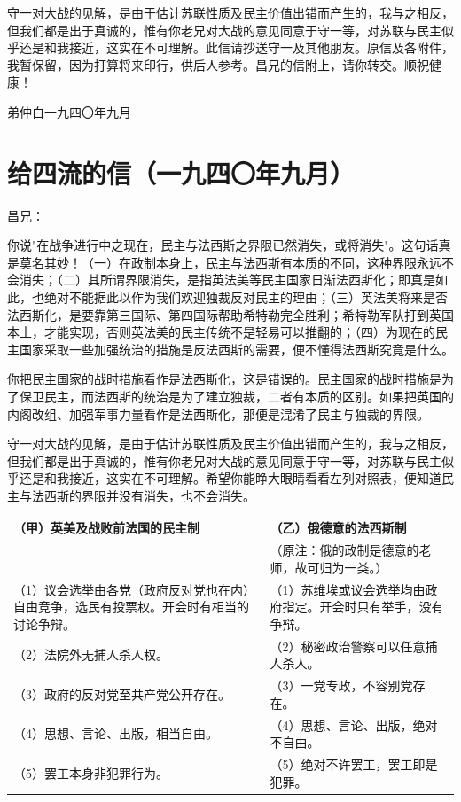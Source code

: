 \documentclass[
  openany,           %
  12pt,              %
  a4paper            %
]{ctexbook}
\begin{document}
守一对大战的见解，是由于估计苏联性质及民主价值出错而产生的，我与之相反，但我们都是出于真诚的，惟有你老兄对大战的意见同意于守一等，对苏联与民主似乎还是和我接近，这实在不可理解。此信请抄送守一及其他朋友。原信及各附件，我暂保留，因为打算将来印行，供后人参考。昌兄的信附上，请你转交。顺祝健康！

\hfill 弟仲白\quad 一九四〇年九月

\chapter{给四流的信（一九四〇年九月）}

\quad\quad 昌兄：

你说"在战争进行中之现在，民主与法西斯之界限已然消失，或将消失"。这句话真是莫名其妙！（一）在政制本身上，民主与法西斯有本质的不同，这种界限永远不会消失；（二）其所谓界限消失，是指英法美等民主国家日渐法西斯化；即真是如此，也绝对不能据此以作为我们欢迎独裁反对民主的理由；（三）英法美将来是否法西斯化，是要靠第三国际、第四国际帮助希特勒完全胜利；希特勒军队打到英国本土，才能实现，否则英法美的民主传统不是轻易可以推翻的；（四）为现在的民主国家采取一些加强统治的措施是反法西斯的需要，便不懂得法西斯究竟是什么。

你把民主国家的战时措施看作是法西斯化，这是错误的。民主国家的战时措施是为了保卫民主，而法西斯的统治是为了建立独裁，二者有本质的区别。如果把英国的内阁改组、加强军事力量看作是法西斯化，那便是混淆了民主与独裁的界限。

守一对大战的见解，是由于估计苏联性质及民主价值出错而产生的，我与之相反，但我们都是出于真诚的，惟有你老兄对大战的意见同意于守一等，对苏联与民主似乎还是和我接近，这实在不可理解。希望你能睁大眼睛看看左列对照表，便知道民主与法西斯的界限并没有消失，也不会消失。

\begin{center}
\small
\begin{tabularx}{\textwidth}{|X|X|}
\hline
\textbf{（甲）英美及战败前法国的民主制} & \textbf{（乙）俄德意的法西斯制} \\
& \small（原注：俄的政制是德意的老师，故可归为一类。）\\
\hline
（1）议会选举由各党（政府反对党也在内）自由竞争，选民有投票权。开会时有相当的讨论争辩。 & （1）苏维埃或议会选举均由政府指定。开会时只有举手，没有争辩。 \\
\hline
（2）法院外无捕人杀人权。 & （2）秘密政治警察可以任意捕人杀人。 \\
\hline
（3）政府的反对党至共产党公开存在。 & （3）一党专政，不容别党存在。 \\
\hline
（4）思想、言论、出版，相当自由。 & （4）思想、言论、出版，绝对不自由。 \\
\hline
（5）罢工本身非犯罪行为。 & （5）绝对不许罢工，罢工即是犯罪。 \\
\hline
\end{tabularx}
\end{center}
\end{document}
